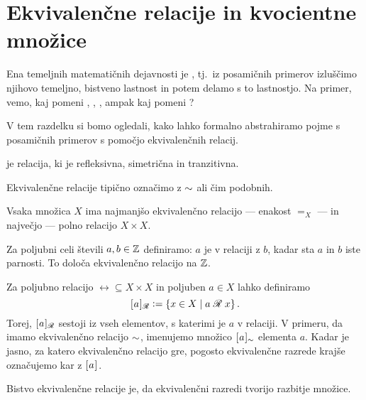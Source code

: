 		
	
	
	\section{Ekvivalenčne relacije in kvocientne množice}
	
		Ena temeljnih matematičnih dejavnosti je  , tj.~iz posamičnih primerov izluščimo njihovo temeljno, bistveno lastnost in potem delamo s to lastnostjo.  Na primer, vemo, kaj pomeni , , , ampak kaj pomeni ?
		
		V tem razdelku si bomo ogledali, kako lahko formalno abstrahiramo pojme s posamičnih primerov s pomočjo ekvivalenčnih relacij.
		
		\begin{definicija}
			 je relacija, ki je refleksivna, simetrična in tranzitivna.
		\end{definicija}
		
		Ekvivalenčne relacije tipično označimo z $\equ$ ali čim podobnih.
		
		\begin{zgled}
			Vsaka množica $X$ ima najmanjšo ekvivalenčno relacijo --- enakost $=_X$ --- in največjo --- polno relacijo $X \times X$.
		\end{zgled}
		
		\begin{zgled}
			Za poljubni celi števili $a, b \in \ZZ$ definiramo: $a$ je v relaciji z $b$, kadar sta $a$ in $b$ iste parnosti. To določa ekvivalenčno relacijo na $\ZZ$.
		\end{zgled}
		
		Za poljubno relacijo $\rel \subseteq X \times X$ in poljuben $a \in X$ lahko definiramo
		\[\ec[\rel]{a} \dfeq \set{x \in X}{\rel[a][x]}.\]
		Torej, $\ec[\rel]{a}$ sestoji iz vseh elementov, s katerimi je $a$ v relaciji. V primeru, da imamo ekvivalenčno relacijo $\equ$, imenujemo množico $\ec[\equ]{a}$  elementa $a$. Kadar je jasno, za katero ekvivalenčno relacijo gre, pogosto ekvivalenčne razrede krajše označujemo kar z $\ec{a}$.
		
		Bistvo ekvivalenčne relacije je, da ekvivalenčni razredi tvorijo razbitje množice.
		
